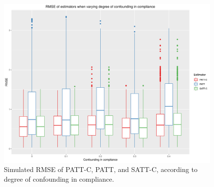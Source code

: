 \documentclass[hidelinks,12pt]{article}
\begin{document}
{\pagebreak

\printbibliography


\pagebreak
\begin{appendices}
	
\newcommand{\hbAppendixPrefix}{A}
%
\renewcommand{\thefigure}{\hbAppendixPrefix\arabic{figure}}
\setcounter{figure}{0}
\renewcommand{\thetable}{\hbAppendixPrefix\arabic{table}} 
\setcounter{table}{0}
\renewcommand{\theequation}{\hbAppendixPrefix\arabic{equation}} 
\setcounter{equation}{0}

\begin{figure}[htbp]
	\begin{center}
		\includegraphics[width = 1\textwidth]{rmse_boxplots_RateConC}
		\caption{Simulated RMSE of PATT-C, PATT, and SATT-C, according to degree of confounding in compliance.\label{fig:rmse_boxplots_RateConC}}
	\end{center}
\end{figure}


\end{appendices}}
\end{document}
